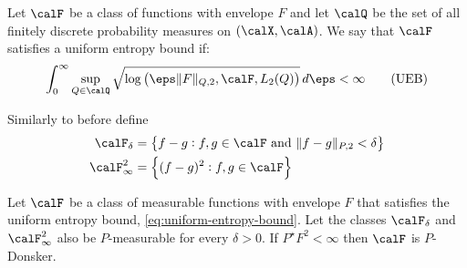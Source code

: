 \begin{definition}
	\label{def:uniform-entropy}
	Let \(\calF\) be a class of functions with envelope \(F\) and let \(\calQ\) be the set of all finitely discrete probability measures on  \((\calX,\calA)\). We say that \(\calF\) satisfies a uniform entropy bound if:
	\begin{equation}
		\label{eq:uniform-entropy-bound}
		\int_{0}^{\infty} \sup_{Q\in\calQ} \sqrt{\log\left(\eps\|F\|_{Q,2},\calF, L_2(Q)\right)}\,d\eps<\infty\tag{UEB}
	\end{equation}
\end{definition}
Similarly to before define
\begin{align}
	\calF_\delta &= \left\{f-g:f,g\in\calF\text{ and }\|f-g\|_{P,2}<\delta\right\} \\
	\calF_\infty^2 &= \left\{(f-g)^2: f,g\in\calF\right\}
\end{align}
\begin{theorem}
	\label{thm:vdv2.5.2}
	Let \(\calF\) be a class of measurable functions with envelope \(F\) that satisfies the uniform entropy bound, \eqref{eq:uniform-entropy-bound}. Let the classes \(\calF_\delta\) and  \(\calF_\infty^2\) also be  \(P\)-measurable for every  \(\delta >0\). If  \(P^\star F^2 <\infty\) then \(\calF\) is  \(P\)-Donsker.
\end{theorem}

